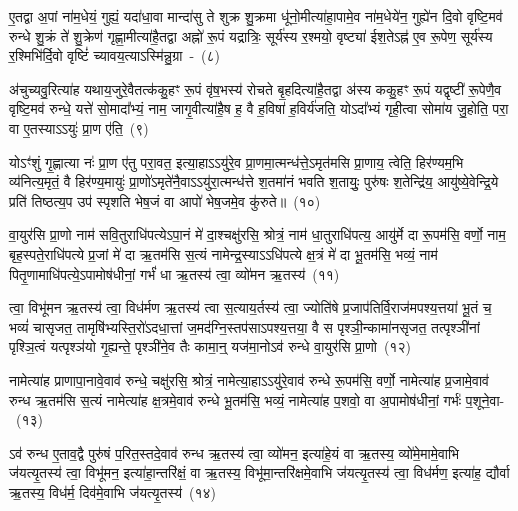 {\anuvakamend[{शक्व॑रीष्व॒ग्नेर्बृह॒स्पतिः॒ पञ्च॑विꣳशतिश्च}]}%

ए॒तद्वा अ॒पां ना॑म॒धेयं॒ गुह्यं॒ यदा॑धा॒वा मान्दा॑सु ते शुक्र शु॒क्रमा धू॑नो॒मीत्या॑हा॒पामे॒व ना॑म॒धेये॑न॒ गुह्ये॑न दि॒वो वृष्टि॒मव॑ रुन्धे शु॒क्रं ते॑ शु॒क्रेण॑ गृह्णा॒मीत्या॑है॒तद्वा अह्नो॑ रू॒पं यद्रात्रिः॒ सूर्य॑स्य र॒श्मयो॒ वृष्ट्या॑ ईश॒ते\-ऽह्न॑ ए॒व रू॒पेण॒ सूर्य॑स्य र॒श्मिभि॑र्दि॒वो वृष्टिं॑ च्यावय॒त्या\-ऽस्मि॑न्नु॒ग्रा~-~(८)

अ॑चुच्यवु॒रित्या॑ह यथाय॒जुरे॒वैतत्क॑कु॒हꣳ रू॒पं वृ॑ष॒भस्य॑ रोचते बृ॒हदित्या॑है॒तद्वा अ॑स्य ककु॒हꣳ रू॒पं यद्वृष्टी॑ रू॒पेणै॒व वृष्टि॒मव॑ रुन्धे॒ यत्ते॑ सो॒मादा᳚भ्यं॒ नाम॒ जागृ॒वीत्या॑है॒ष ह॒ वै ह॒विषा॑ ह॒विर्य॑जति॒ यो\-ऽ\-दा᳚भ्यं गृही॒त्वा सोमा॑य जु॒होति॒ परा॒ वा ए॒तस्याऽऽयुः॑ प्रा॒ण ए॑ति॒~(९)

यो\-ऽꣳ॑शुं गृ॒ह्णात्या नः॑ प्रा॒ण ए॑तु परा॒वत॒ इत्या॒हाऽऽयु॑रे॒व प्रा॒णमा॒त्मन्ध॑त्ते॒\-ऽमृत॑मसि प्रा॒णाय॒ त्वेति॒ हिर॑ण्यम॒भि व्य॑नित्य॒मृतं॒ वै हिर॑ण्य॒मायुः॑ प्रा॒णो॑\-ऽमृते॑नै॒वा\-ऽ\-ऽ\-यु॑रा॒त्मन्ध॑त्ते श॒तमा॑नं भवति श॒तायुः॒ पुरु॑षः श॒तेन्द्रि॑य॒ आयु॑ष्ये॒वेन्द्रि॒ये प्रति॑ तिष्ठत्य॒प उप॑ स्पृशति भेष॒जं वा आपो॑ भेष॒जमे॒व कु॑रुते॥~(१०)

{\anuvakamend[{उ॒ग्रा ए॒त्याप॒स्त्रीणि॑ च}]}%

वा॒युर॑सि प्रा॒णो नाम॑ सवि॒तुराधि॑पत्ये\-ऽपा॒नं मे॑ दा॒श्चक्षु॑रसि॒ श्रोत्रं॒ नाम॑ धा॒तुराधि॑पत्य॒ आयु॑र्मे दा रू॒पम॑सि॒ वर्णो॒ नाम॒ बृह॒स्पते॒राधि॑पत्ये प्र॒जां मे॑ दा ऋ॒तम॑सि स॒त्यं नामेन्द्र॒स्याऽऽधि॑पत्ये क्ष॒त्रं मे॑ दा भू॒तम॑सि॒ भव्यं॒ नाम॑ पितृ॒णामाधि॑पत्ये॒\-ऽपामोष॑धीनां॒ गर्भं॑ धा ऋ॒तस्य॑ त्वा॒ व्यो॑मन ऋ॒तस्य॑~(११)

त्वा॒ विभू॑मन ऋ॒तस्य॑ त्वा॒ विध॑र्मण ऋ॒तस्य॑ त्वा स॒त्याय॒र्तस्य॑ त्वा॒ ज्योति॑षे प्र॒जा\-प॑तिर्वि॒राज॑मपश्य॒त्तया॑ भू॒तं च॒ भव्यं॑ चासृजत॒ तामृषि॑भ्यस्ति॒रो॑\-ऽदधा॒त्तां ज॒मद॑ग्नि॒स्तप॑सा\-ऽपश्य॒त्तया॒ वै स पृश्ञी॒न्कामा॑नसृजत॒ तत्पृश्ञी॑नां पृश्ञि॒त्वं यत्पृश्ञ॑यो गृ॒ह्यन्ते॒ पृश्ञी॑ने॒व तैः कामा॒न्॒ यज॑मा॒नो\-ऽव॑ रुन्धे वा॒युर॑सि प्रा॒णो~(१२)

नामेत्या॑ह प्राणापा॒नावे॒वाव॑ रुन्धे॒ चक्षु॑रसि॒ श्रोत्रं॒ नामेत्या॒हाऽऽयु॑रे॒वाव॑ रुन्धे रू॒पम॑सि॒ वर्णो॒ नामेत्या॑ह प्र॒जामे॒वाव॑ रुन्ध ऋ॒तम॑सि स॒त्यं नामेत्या॑ह क्ष॒त्रमे॒वाव॑ रुन्धे भू॒तम॑सि॒ भव्यं॒ नामेत्या॑ह प॒शवो॒ वा अ॒पामोष॑धीनां॒ गर्भः॑ प॒शूने॒वा-~(१३)

ऽव॑ रुन्ध ए॒ताव॒द्वै पुरु॑षं प॒रित॒स्तदे॒वाव॑ रुन्ध ऋ॒तस्य॑ त्वा॒ व्यो॑मन॒ इत्या॑हे॒यं वा ऋ॒तस्य॒ व्यो॑मे॒मामे॒वाभि ज॑यत्यृ॒तस्य॑ त्वा॒ विभू॑मन॒ इत्या॑हा॒न्तरि॑क्षं॒ वा ऋ॒तस्य॒ विभू॑मा॒न्तरि॑क्षमे॒वाभि ज॑यत्यृ॒तस्य॑ त्वा॒ विध॑र्मण॒ इत्या॑ह॒ द्यौर्वा ऋ॒तस्य॒ विध॑र्म॒ दिव॑मे॒वाभि ज॑यत्यृ॒तस्य॑~(१४)

